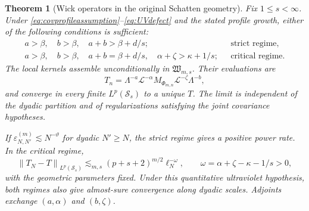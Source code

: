 \documentclass[11pt,a4paper]{amsart}
\numberwithin{equation}{section}
\newtheorem{theorem}{Theorem}[section]
\theoremstyle{definition}
\theoremstyle{remark}
\newcommand{\Sch}{\mathcal S}
\newcommand{\Wc}{\mathfrak W}
\newcommand{\norm}[1]{\left\lVert#1\right\rVert}
\begin{document}
\begin{theorem}[Wick operators in the original Schatten geometry]\label{thm:geometric}
Fix $1\le s<\infty$. Under \eqref{eq:covprofileassumption}--\eqref{eq:UVdefect} and the stated profile growth, either of the following conditions is sufficient:
\begin{align}
 a>\beta,\quad b>\beta,\quad a+b>\beta+d/s;
 &\hspace{8pt}\text{strict regime},\label{eq:strictface}\\
 a>\beta,\quad b>\beta,\quad a+b=\beta+d/s,\quad
 \alpha+\zeta>\kappa+1/s;
 &\hspace{8pt}\text{critical regime}.\label{eq:criticalface}
\end{align}
The local kernels assemble unconditionally in $\Wc_{m,s}$. Their evaluations are
\begin{equation}\label{eq:wickgeometry}
 T_n=\Lambda^{-a}\mathscr L^{-\alpha}
       M_{\Phi_{m,n}}\mathscr L^{-\zeta}\Lambda^{-b},
\end{equation}
and converge in every finite $L^p(\Sch_s)$ to a unique $T$. The limit is independent of the dyadic partition and of regularizations satisfying the joint covariance hypotheses.

If $\varepsilon_{N,N'}^{(m)}\lesssim N^{-\vartheta}$ for dyadic $N'\ge N$, the strict regime gives a positive power rate. In the critical regime,
\begin{equation}\label{eq:geomrate}
 \norm{T_N-T}_{L^p(\Sch_s)}\lesssim_{m,s}(p+s+2)^{m/2}\ell_N^{-\omega},
 \qquad \omega=\alpha+\zeta-\kappa-1/s>0,
\end{equation}
with the geometric parameters fixed. Under this quantitative ultraviolet hypothesis, both regimes also give almost-sure convergence along dyadic scales. Adjoints exchange $(a,\alpha)$ and $(b,\zeta)$.
\end{theorem}
\end{document}
